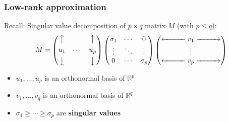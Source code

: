 \documentclass[smaller]{beamer}
\def\R{{\mathbb R}}
\def\darkgreen{\color{green!60!black}}
\def\R{{\mathbb R}}
\begin{document}
\begin{frame}
\frametitle{Low-rank approximation}

Recall: Singular value decomposition of $p \times q$ matrix $M$ (with $p \leq q$): 
$$
M = 
\begin{pmatrix}
\big\uparrow    &         & \big\uparrow \\[.05in]
u_1             &  \cdots & u_p  \\[.05in]
\big\downarrow  &         & \big\downarrow
\end{pmatrix}
\begin{pmatrix}
\sigma_1  & \cdots & 0       \\
\vdots    & \ddots & \vdots  \\
0         & \cdots & \sigma_p            
\end{pmatrix}
\begin{pmatrix} 
\xleftarrow{\hspace*{1cm}} v_1 \xrightarrow{\hspace*{1cm}} \\
\vdots \\
\xleftarrow{\hspace*{1cm}} v_p \xrightarrow{\hspace*{1cm}} 
\end{pmatrix}
$$
\begin{itemize}
\item {\darkgreen $u_1, \ldots, u_p$ is an orthonormal basis of $\R^p$}
\item {\darkgreen $v_1, \ldots, v_q$ is an orthonormal basis of $\R^q$}
\item {\darkgreen $\sigma_1 \geq \cdots \geq \sigma_p$ are {\bf singular values}}
\end{itemize}


\end{frame}
\end{document}
